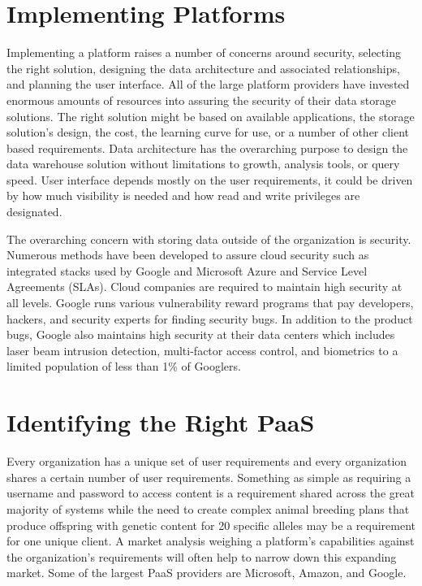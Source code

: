 \documentclass[sigconf]{acmart}
\begin{document}
\section{Implementing Platforms}
Implementing a platform raises a number of concerns around security, selecting the right solution, designing the data architecture and associated relationships, and planning the user interface. All of the large platform providers have invested enormous amounts of resources into assuring the security of their data storage solutions. The right solution might be based on available applications, the storage solution's design, the cost, the learning curve for use, or a number of other client based requirements. Data architecture has the overarching purpose to design the data warehouse solution without limitations to growth, analysis tools, or query speed. User interface depends mostly on the user requirements, it could be driven by how much visibility is needed and how read and write privileges are designated. 

The overarching concern with storing data outside of the organization is security. Numerous methods have been developed to assure cloud security such as integrated stacks used by Google and Microsoft Azure and Service Level Agreements (SLAs)\cite{Casola}. Cloud companies are required to maintain high security at all levels. Google runs various vulnerability reward programs that pay developers, hackers, and security experts for finding security bugs. In addition to the product bugs, Google also maintains high security at their data centers which includes laser beam intrusion detection, multi-factor access control, and biometrics to a limited population of less than 1\% of Googlers\cite{www-gcp-security}. 

\section{Identifying the Right PaaS}
Every organization has a unique set of user requirements and every organization shares a certain number of user requirements. Something as simple as requiring a username and password to access content is a requirement shared across the great majority of systems while the need to create complex animal breeding plans that produce offspring with genetic content for 20 specific alleles may be a requirement for one unique client. A market analysis weighing a platform's capabilities against the organization's requirements will often help to narrow down this expanding market. Some of the largest PaaS providers are Microsoft, Amazon, and Google. 
\end{document}
